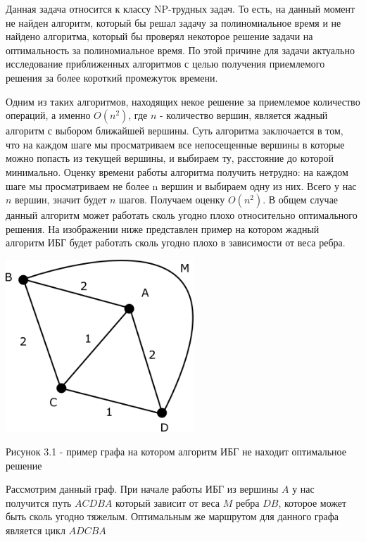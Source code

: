 \documentclass[a4paper, 14pt]{extarticle}
\begin{document}
Данная задача относится к классу NP-трудных задач. То есть, на данный момент не найден алгоритм, который бы решал задачу за полиномиальное время и не найдено алгоритма, который бы проверял некоторое решение задачи на оптимальность за полиномиальное время. По этой причине для задачи актуально исследование приближенных алгоритмов с целью получения приемлемого решения за более короткий промежуток времени.

Одним из таких алгоритмов, находящих некое решение за приемлемое количество операций, а именно $O(n^{2})$, где $n$ - количество вершин, является жадный алгоритм с выбором ближайшей вершины. Суть алгоритма заключается в том, что на каждом шаге мы просматриваем все непосещенные вершины в которые можно попасть из текущей вершины, и выбираем ту, расстояние до которой минимально. Оценку времени работы алгоритма получить нетрудно: на каждом шаге мы просматриваем не более n вершин и выбираем одну из них. Всего у нас $n$ вершин, значит будет $n$ шагов. Получаем оценку $O(n^{2})$. В общем случае данный алгоритм может работать сколь угодно плохо относительно оптимального решения. На изображении ниже представлен пример на котором жадный алгоритм ИБГ будет работать сколь угодно плохо в зависимости от веса ребра.

\begin{center}
\includegraphics[width=200pt]{ris_example.png}
\end{center}

\begin{center}
Рисунок 3.1 - пример графа на котором алгоритм ИБГ не находит оптимальное решение
\end{center}

Рассмотрим данный граф. При начале работы ИБГ из вершины $A$ у нас получится путь $ACDBA$ который зависит от веса $M$ ребра $DB$, которое может быть сколь угодно тяжелым. Оптимальным же маршрутом для данного графа является цикл $ADCBA$
\end{document}
